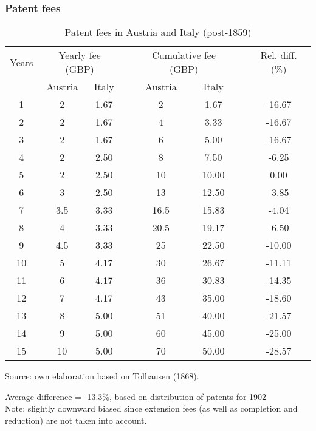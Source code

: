 \documentclass[10pt]{beamer}
\begin{document}
\begin{frame}[label = patent_fees]
    \frametitle{Patent fees}

\begin{table}[!h]
\caption{\label{tab:pat_fees} Patent fees in Austria and Italy (post-1859)}
\centering
\fontsize{8}{8}\selectfont

    \begin{tabular}{cccccccc}
        \hline
        Years & \multicolumn{2}{c}{Yearly fee (GBP)} &   & \multicolumn{2}{c}{Cumulative fee (GBP)} &   & Rel. diff. (\%) \\
        \cline{2-3}\cline{5-6}  & Austria & Italy &   & Austria & Italy &   &  \\
        \hline
        1 & 2 & 1.67 &   & 2 & 1.67 &   & -16.67 \\
        2 & 2 & 1.67 &   & 4 & 3.33 &   & -16.67 \\
        3 & 2 & 1.67 &   & 6 & 5.00 &   & -16.67 \\
        4 & 2 & 2.50 &   & 8 & 7.50 &   & -6.25 \\
        5 & 2 & 2.50 &   & 10 & 10.00 &   & 0.00 \\
        6 & 3 & 2.50 &   & 13 & 12.50 &   & -3.85 \\
        7 & 3.5 & 3.33 &   & 16.5 & 15.83 &   & -4.04 \\
        8 & 4 & 3.33 &   & 20.5 & 19.17 &   & -6.50 \\
        9 & 4.5 & 3.33 &   & 25 & 22.50 &   & -10.00 \\
        10 & 5 & 4.17 &   & 30 & 26.67 &   & -11.11 \\
        11 & 6 & 4.17 &   & 36 & 30.83 &   & -14.35 \\
        12 & 7 & 4.17 &   & 43 & 35.00 &   & -18.60 \\
        13 & 8 & 5.00 &   & 51 & 40.00 &   & -21.57 \\
        14 & 9 & 5.00 &   & 60 & 45.00 &   & -25.00 \\
        15 & 10 & 5.00 &   & 70 & 50.00 &   & -28.57 \\
        \hline
    \end{tabular}%
        
    Source: own elaboration based on Tolhausen (1868).

\smallskip
\raggedright Average difference = -13.3\%, based on distribution of patents for 1902 \hyperlink{duration}{}  \\
Note: slightly downward biased since extension fees (as well as completion and reduction) are not taken into account.
    
\end{table}
    
\end{frame}
\end{document}
